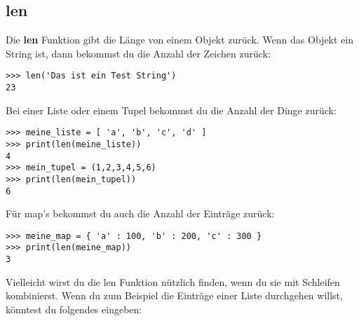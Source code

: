 \subsection*{len}

Die \textbf{len} Funktion gibt die Länge von einem Objekt zurück. Wenn das Objekt ein String ist, dann bekommst du die Anzahl der Zeichen zurück:

\begin{Verbatim}[frame=single]
>>> len('Das ist ein Test String')
23
\end{Verbatim}

\noindent
Bei einer Liste oder einem Tupel bekommst du die Anzahl der Dinge zurück:

\begin{Verbatim}[frame=single]
>>> meine_liste = [ 'a', 'b', 'c', 'd' ]
>>> print(len(meine_liste))
4
>>> mein_tupel = (1,2,3,4,5,6)
>>> print(len(mein_tupel))
6
\end{Verbatim}

\noindent
Für map's bekommst du auch die Anzahl der Einträge zurück:

\begin{Verbatim}[frame=single]
>>> meine_map = { 'a' : 100, 'b' : 200, 'c' : 300 }
>>> print(len(meine_map))
3
\end{Verbatim}

\noindent
Vielleicht wirst du die len Funktion nützlich finden, wenn du sie mit Schleifen kombinierst. Wenn du zum Beispiel die Einträge einer Liste durchgehen willst, könntest du folgendes eingeben:

